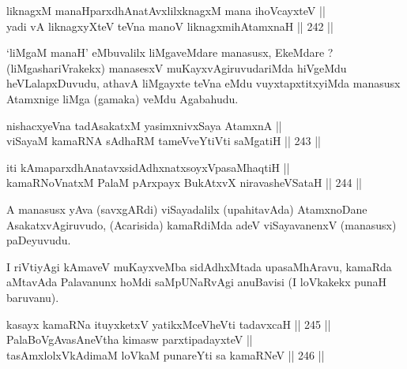 
\begin{shl}
liknagxM manaHparxdhAnatAvxlilxknagxM mana ihoVcayxteV || \\
yadi vA liknagxyXteV teVna manoV liknagxmihA\s \s tamxnaH \hfill || 242 ||  
\end{shl}

\begin{artha}
`liMgaM manaH' eMbuvalilx liMgaveMdare manasusx, EkeMdare ?
(liMgashariVrakekx) manasesxV muKayxvAgiruvudariMda hiVgeMdu
heVLalapxDuvudu, athavA liMgayxte teVna eMdu vuyxtapxtitxyiMda
manasusx Atamxnige liMga (gamaka) veMdu Agabahudu.
\end{artha}

\begin{shl}
nishacxyeVna tadAsakatxM yasimxnivxSaya AtamxnA || \\
viSayaM kamaRNA sAdhaRM tameVveYtiVti saMgatiH \hfill || 243 ||  
\end{shl}

\begin{shl}
iti kAmaparxdhAnatavxsidAdhxnatxsoyxVpasaMhaqtiH || \\
kamaRNoV\s natxM PalaM pArxpayx BukAtxvX niravasheVSataH \hfill || 244 ||  
\end{shl}

\begin{artha}
A manasusx yAva (savxgARdi) viSayadalilx (upahitavAda) AtamxnoDane
AsakatxvAgiruvudo, (Acarisida) kamaRdiMda adeV viSayavanenxV (manasusx)
paDeyuvudu.
\end{artha}


\begin{artha}
I riVtiyAgi kAmaveV muKayxveMba sidAdhxMtada upasaMhAravu, kamaRda
aMtavAda Palavanunx hoMdi saMpUNaRvAgi anuBavisi (I loVkakekx punaH
baruvanu).
\end{artha}


\begin{shl}
kasayx kamaRNa ituyxketxV yatikxMceVheVti tadavxcaH \hfill || 245 ||  \\
PalaBoVgAvasAneV\s tha kimasw parxtipadayxteV || \\
tasAmxlolxVkAdimaM loVkaM punareYti sa kamaRNeV \hfill || 246 ||  
\end{shl}

